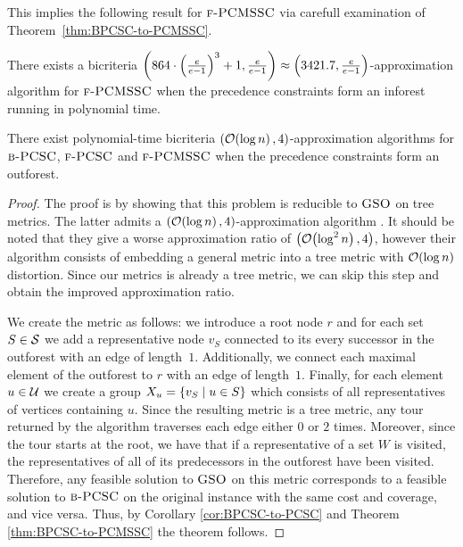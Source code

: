 This implies the following result for $\textup{\textsc{f-PCMSSC}}$ via carefull examination of Theorem~\ref{thm:BPCSC-to-PCMSSC}.
\begin{corollary}\label{cor:BPCSC-inforest-to-PCMSSC}
    There exists a bicriteria $\mathopen{}\left( 864\cdot\mathopen{}\left( \frac{e}{e-1} \right)^3+1, \frac{e}{e-1} \right)\approx\mathopen{}\left( 3421.7, \frac{e}{e-1} \right)$-approximation algorithm for $\textup{\textsc{f-PCMSSC}}$ when the precedence constraints form an inforest running in polynomial time.
\end{corollary}
\begin{theorem}\label{thm:BPCSC-outforest}
    There exist polynomial-time bicriteria $\mathopen{}\left( \mathcal{O}\mathopen{}\left( \log n \right), 4 \right)$-approximation algorithms for $\textup{\textsc{b-PCSC}}$,  $\textup{\textsc{f-PCSC}}$ and $\textup{\textsc{f-PCMSSC}}$ when the precedence constraints form an outforest.
\end{theorem}
\begin{proof}
    The proof is by showing that this problem is reducible to $\textup{\textsc{GSO}}$ on tree metrics.
    The latter admits a $\mathopen{}\left( \mathcal{O}\mathopen{}\left( \log n \right), 4 \right)$-approximation algorithm \cite{ApproxAlgsForOptDTsAndAdapTSPProblems}.
    It should be noted that they give a worse approximation ratio of $\mathopen{}\left( \mathcal{O}\mathopen{}\left( \log^2 n \right), 4 \right)$, however their algorithm consists of embedding a general metric into a tree metric with $\mathcal{O}\mathopen{}\left( \log n \right)$ distortion.
    Since our metrics is already a tree metric, we can skip this step and obtain the improved approximation ratio.
    
    We create the metric as follows: we introduce a root node $r$ and for each set $S\in\mathcal{S}$ we add a representative node $v_S$ connected to its every successor in the outforest with an edge of length~$1$.
    Additionally, we connect each maximal element of the outforest to $r$ with an edge of length~$1$. Finally, for each element $u\in\mathcal{U}$ we create a group $X_u=\mathopen{}\left\{ v_S \mid u\in S \right\}$ which consists of all representatives of vertices containing $u$. Since the resulting metric is a tree metric, any tour returned by the algorithm traverses each edge either $0$ or $2$ times.
    Moreover, since the tour starts at the root, we have that if a representative of a set $W$ is visited, the representatives of all of its predecessors in the outforest have been visited.
    Therefore, any feasible solution to $\textup{\textsc{GSO}}$ on this metric corresponds to a feasible solution to $\textup{\textsc{b-PCSC}}$ on the original instance with the same cost and coverage, and vice versa. Thus, by Corollary \ref{cor:BPCSC-to-PCSC} and Theorem \ref{thm:BPCSC-to-PCMSSC} the theorem follows.
\end{proof}


